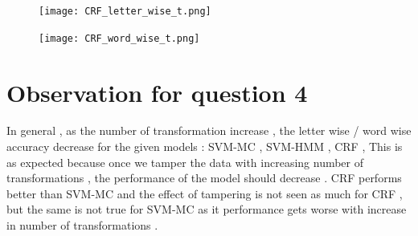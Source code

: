 \documentclass[11pt]{report}
\begin{document}
\begin{figure}[t!]
\begin{minipage}[b]{0.50\textwidth}
\centering
\vspace{-0.6em}
\texttt{[image: CRF\_letter\_wise\_t.png]}
\vspace{0.6em}
\end{minipage}

\begin{minipage}[b]{0.50\textwidth}
\centering
\vspace{-0.6em}
\texttt{[image: CRF\_word\_wise\_t.png]}
\vspace{0.6em}
\end{minipage}
\end{figure}


\section*{Observation for question 4}
In general , as the number of transformation increase , the letter wise / word wise accuracy decrease for the given models : SVM-MC , SVM-HMM , CRF ,
This is as expected because once we tamper the data with increasing number of transformations , the performance of the model should decrease .
CRF performs better than SVM-MC and the effect of tampering is not seen as much for CRF , but the same is not true for SVM-MC as 
it performance gets worse with increase in number of transformations .
\end{document}
